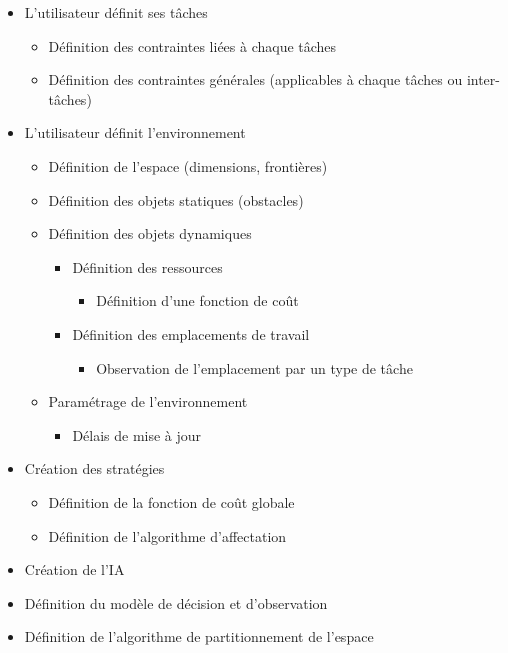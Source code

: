 \renewcommand{\labelitemii}{$\hookrightarrow$}
\renewcommand{\labelitemiii}{$\circ$}
\begin{itemize}
\setlength{\itemsep}{5pt}
\item L'utilisateur définit ses tâches
	\begin{itemize}
	\setlength{\itemsep}{2pt}
	\item Définition des contraintes liées à chaque tâches
	\item Définition des contraintes générales (applicables à chaque tâches ou inter-tâches)
	\end{itemize}
\item L'utilisateur définit l'environnement
	\begin{itemize}
	\setlength{\itemsep}{2pt}
	\item Définition de l'espace (dimensions, frontières)
	\item Définition des objets statiques (obstacles)
	\item Définition des objets dynamiques
		\begin{itemize}
		\item Définition des ressources
			\begin{itemize}
			\item Définition d'une fonction de coût
			\end{itemize}
		\item Définition des emplacements de travail
			\begin{itemize}
			\item Observation de l'emplacement par un type de tâche
			\end{itemize}
		\end{itemize}
	\item Paramétrage de l'environnement
		\begin{itemize}
		\item Délais de mise à jour
		\end{itemize}
	\end{itemize}
\item Création des stratégies
	\begin{itemize}
	\setlength{\itemsep}{2pt}
	\item Définition de la fonction de coût globale
	\item Définition de l'algorithme d'affectation
	\end{itemize}
\item Création de l'IA
\item Définition du modèle de décision et d'observation
\item Définition de l'algorithme de partitionnement de l'espace

\end{itemize}
